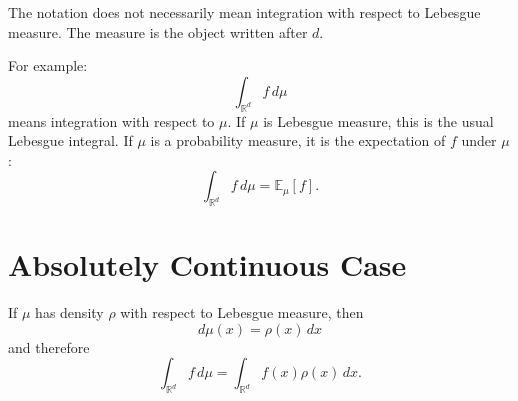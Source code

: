 \documentclass[11pt]{article}
\begin{document}
The notation does not necessarily mean integration with respect to Lebesgue
measure. The measure is the object written after $d$.

For example:
\[
\int_{\mathbb R^d} f\,d\mu
\]
means integration with respect to $\mu$. If $\mu$ is Lebesgue measure, this is
the usual Lebesgue integral. If $\mu$ is a probability measure, it is the
expectation of $f$ under $\mu$:
\[
\int_{\mathbb R^d} f\,d\mu = \mathbb E_\mu[f].
\]

\section*{Absolutely Continuous Case}

If $\mu$ has density $\rho$ with respect to Lebesgue measure, then
\[
d\mu(x)=\rho(x)\,dx
\]
and therefore
\[
\int_{\mathbb R^d} f\,d\mu
=
\int_{\mathbb R^d} f(x)\rho(x)\,dx.
\]
\end{document}
